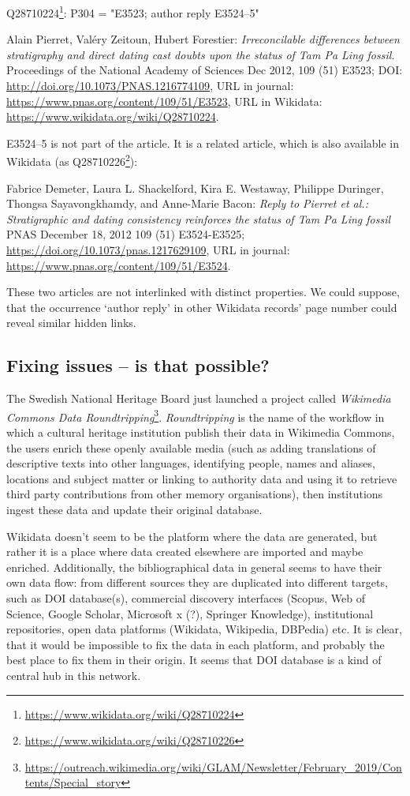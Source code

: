 Q28710224\footnote{\url{https://www.wikidata.org/wiki/Q28710224}}: P304 = "E3523; author reply E3524–5"

Alain Pierret, Valéry Zeitoun, Hubert Forestier: \emph{Irreconcilable differences between stratigraphy and direct dating cast doubts upon the status of Tam Pa Ling fossil.} Proceedings of the National Academy of Sciences Dec 2012, 109 (51) E3523; DOI: \url{http://doi.org/10.1073/PNAS.1216774109}, URL in journal: \url{https://www.pnas.org/content/109/51/E3523}, URL in Wikidata: \url{https://www.wikidata.org/wiki/Q28710224}.

E3524–5 is not part of the article. It is a related article, which is also available in Wikidata (as Q28710226\footnote{\url{https://www.wikidata.org/wiki/Q28710226}}):

Fabrice Demeter, Laura L. Shackelford, Kira E. Westaway, Philippe Duringer, Thongsa Sayavongkhamdy, and Anne-Marie Bacon: \emph{Reply to Pierret et al.: Stratigraphic and dating consistency reinforces the status of Tam Pa Ling fossil} PNAS December 18, 2012 109 (51) E3524-E3525; \url{https://doi.org/10.1073/pnas.1217629109}, URL in journal: \url{https://www.pnas.org/content/109/51/E3524}.

These two articles are not interlinked with distinct properties. We could suppose, that the occurrence `author reply' in other Wikidata records' page number could reveal similar hidden links.

\subsection{Fixing issues -- is that possible?}

The Swedish National Heritage Board just launched a project called \emph{Wikimedia Commons Data Roundtripping}\footnote{\url{https://outreach.wikimedia.org/wiki/GLAM/Newsletter/February_2019/Contents/Special_story}}. \emph{Roundtripping} is the name of the workflow in which a cultural heritage institution publish their data in Wikimedia Commons, the users enrich these openly available media (such as adding translations of descriptive texts into other languages, identifying people, names and aliases, locations and subject matter or linking to authority data and using it to retrieve third party contributions from other memory organisations), then institutions ingest these data and update their original database.

Wikidata doesn't seem to be the platform where the data are generated, but rather it is a place where data created elsewhere are imported and maybe enriched. Additionally, the bibliographical data in general seems to have their own data flow: from different sources they are duplicated into different targets, such as DOI database(s), commercial discovery interfaces (Scopus, Web of Science, Google Scholar, Microsoft x (?), Springer Knowledge), institutional repositories, open data platforms (Wikidata, Wikipedia, DBPedia) etc. It is clear, that it would be impossible to fix the data in each platform, and probably the best place to fix them in their origin. It seems that DOI database is a kind of central hub in this network.

